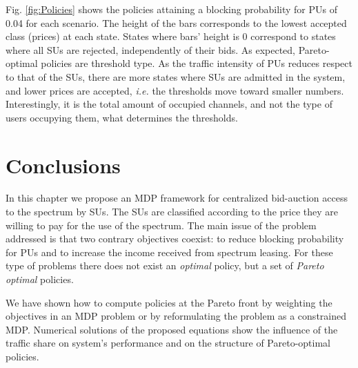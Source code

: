 Fig. \ref{fig:Policies} shows the policies attaining a blocking probability for PUs of 0.04 for each scenario.
The height of the bars corresponds to the lowest accepted class (prices) at each state. States where bars' height is $0$ correspond to states where all SUs are rejected, independently of their bids. As expected, Pareto-optimal policies are threshold type. As the traffic intensity of PUs reduces respect to that of the SUs, there are more states where SUs are admitted in the system, and lower prices are accepted, \textit{i.e.} the thresholds move toward smaller numbers. Interestingly, it is the total amount of occupied channels, and not the type of users occupying them, what determines the thresholds.


\section{Conclusions}\label{Sarnoff_sec_conclusions}
In this chapter we propose an MDP framework for centralized bid-auction access to the spectrum by SUs. The SUs are classified according to the price they are willing to pay for the use of the spectrum. The main issue of the problem addressed is that two contrary objectives coexist: to reduce blocking probability for PUs and to increase the income received from spectrum leasing. For these type of problems there does not exist an \textit{optimal} policy, but a set of \textit{Pareto optimal} policies. 

We have shown how to compute policies at the Pareto front by weighting the objectives in an MDP problem or by reformulating the problem as a constrained MDP. 
Numerical solutions of the proposed equations show the influence of the traffic share on system's performance and on the structure of Pareto-optimal policies. 



